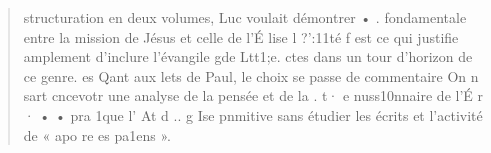 \begin{quote}
    structuration en deux volumes, Luc voulait démontrer • .
fondamentale entre la mission de Jésus et celle de l'É lise  l ?':11té f est ce qui justifie amplement d'inclure l'évangile gde Ltt1;e.
ctes dans un tour d'horizon de ce genre. es
Qant aux lets de Paul, le choix se passe de commentaire On n
sart cncevotr une analyse de la pensée et de la . t· e
nuss10nnaire de l'É r · • • pra 1que
l' At d .. g Ise pnmitive sans étudier les écrits et l'activité de
« apo re es pa1ens ».
\end{quote}